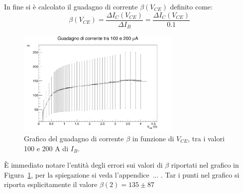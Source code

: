 \documentclass[../main.tex]{subfiles}
\begin{document}
    In fine si è calcolato il guadagno di corrente $\beta(V_{CE})$ definito come:
    \begin{equation*}
        \beta(V_{CE}) = \frac{\varDelta I_C(V_{CE})}{\varDelta I_B} = \frac{\varDelta I_C(V_{CE})}{0.1}
    \end{equation*}

    \begin{figure}[h!]
        \centering
        \includegraphics[width=0.7\textwidth]{../../images/beta}
        \caption{
            Grafico del guadagno di corrente $\beta$ in funzione di
            $V_{CE}$, tra i valori 100 e 200 \textmu A di $I_B$.
        }
        \label{fig:beta}
    \end{figure}
    È immediato notare l'entità degli errori sui valori di $\beta$
    riportati nel grafico in Figura~\ref{fig:beta}, per la
    spiegazione si veda l'appendice~... .
    Tar i punti nel grafico si riporta esplicitamente il valore $\beta(2) = 135 \pm  87$
\end{document}

